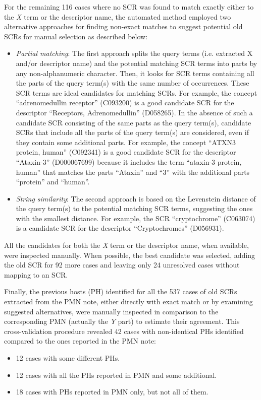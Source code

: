For the remaining 116 cases where no SCR was found to match exactly either to the \textit{X} term or the descriptor name, the automated method employed two alternative approaches for finding non-exact matches to suggest potential old SCRs for manual selection as described below:
\begin{itemize}
    \item \textit{Partial matching}:
     The first approach splits the query terms (i.e. extracted X and/or descriptor name) and the potential matching SCR terms into parts by any non-alphanumeric character. Then, it looks for SCR terms containing all the parts of the query term(s) with the same number of occurrences. These SCR terms are ideal candidates for matching SCRs. For example, the concept “adrenomedullin receptor” (C093200) is a good candidate SCR for the descriptor “Receptors, Adrenomedullin” (D058265).
    In the absence of such a candidate SCR consisting of the same parts as the query term(s), candidate SCRs that include all the parts of the query term(s) are considered, even if they contain some additional parts. For example, the concept ``ATXN3 protein, human'' (C092341) is a good candidate SCR for the descriptor ``Ataxin-3'' (D000067699) because it includes the term ``ataxin-3 protein, human'' that matches the parts ``Ataxin'' and ``3'' with the additional parts ``protein'' and ``human''.
   \item \textit{String similarity}:
   The second approach is based on the Levenstein distance of the query term(s) to the potential matching SCR terms, suggesting the ones with the smallest distance. For example, the SCR ``cryptochrome'' (C063074) is a candidate SCR for the descriptor ``Cryptochromes'' (D056931).
\end{itemize}

All the candidates for both the \textit{X} term or the descriptor name, when available, were inspected manually. When possible, the best candidate was selected, adding the old SCR for 92 more cases and leaving only 24 unresolved cases without mapping to an SCR.

Finally, the previous hosts (PH) identified for all the 537 cases of old SCRs extracted from the PMN note, either directly with exact match or by examining suggested alternatives, were manually inspected in comparison to the corresponding PMN (actually the \textit{Y} part) to estimate their agreement. This cross-validation procedure revealed 42 cases with non-identical PHs identified compared to the ones reported in the PMN note:
\begin{itemize}
    \item 12 cases with some different PHs.
    \item 12 cases with all the PHs reported in PMN and some additional.
    \item 18 cases with PHs reported in PMN only, but not all of them.
\end{itemize}


